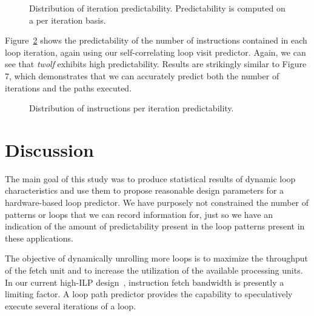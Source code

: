 \documentclass[times,10pt,twocolumn]{article}
\newcommand{\vs}{\vspace}
\begin{document}
\begin{figure}
\vspace{0.2 in}
\setlength{\epsfxsize}{9.5cm}%
\centerline{}
\caption{Distribution of iteration predictability.  Predictability is
computed on a per iteration basis.}
\label{fig:fig7}
\end{figure}


Figure~\ref{fig:fig8} shows the predictability of the number of 
instructions contained in each loop iteration, again using our
self-correlating loop visit predictor. Again, we can see that 
{\it twolf} exhibits high predictability.  Results are strikingly similar
to Figure 7, which demonstrates that we can accurately predict both
the number of iterations and the paths executed.

\begin{figure}
\vspace{0.2 in}
\setlength{\epsfxsize}{10cm}%
\centerline{}
\caption{Distribution of instructions per iteration predictability.}
\label{fig:fig8}
\end{figure}

    
\section{Discussion}

The main goal of this study was to produce statistical results of dynamic 
loop characteristics and use them to propose reasonable design parameters for 
a hardware-based loop predictor. We have purposely not
constrained the number of patterns or loops that we can record information
for, just so we have an indication of the amount of predictability present
in the loop patterns present in these applications.

The objective of dynamically unrolling more
loops is to maximize the throughput of the fetch unit and to increase the 
utilization of the available processing units.  In our current high-ILP
design~\cite{LevoTech01}, instruction fetch bandwidth is presently a limiting factor.
A loop path predictor provides the capability to speculatively
execute several iterations of a loop.
\end{document}
